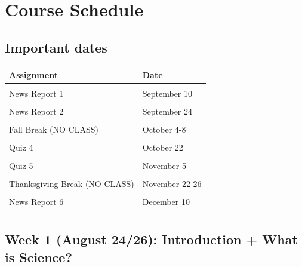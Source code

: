 \documentclass[
  11pt,
]{article}
\begin{document}
\hypertarget{course-schedule}{%
\section{Course Schedule}\label{course-schedule}}

\hypertarget{important-dates}{%
\subsection{Important dates}\label{important-dates}}

\begin{table}[!h]
\centering
\begin{tabular}[t]{ll}
\toprule
Assignment & Date\\
\midrule
\cellcolor{gray!6}{Quiz 1} & \cellcolor{gray!6}{September 3}\\
News Report 1 & September 10\\
\cellcolor{gray!6}{Quiz 2} & \cellcolor{gray!6}{September 17}\\
News Report 2 & September 24\\
\cellcolor{gray!6}{Quiz 3} & \cellcolor{gray!6}{October 1}\\
\addlinespace
Fall Break (NO CLASS) & October 4-8\\
\cellcolor{gray!6}{News Report 3} & \cellcolor{gray!6}{October 15}\\
Quiz 4 & October 22\\
\cellcolor{gray!6}{News Report 4} & \cellcolor{gray!6}{October 29}\\
Quiz 5 & November 5\\
\addlinespace
\cellcolor{gray!6}{News Report 5} & \cellcolor{gray!6}{November 12}\\
Thanksgiving Break (NO CLASS) & November 22-26\\
\cellcolor{gray!6}{Quiz 6} & \cellcolor{gray!6}{December 3}\\
News Report 6 & December 10\\
\cellcolor{gray!6}{Final Exam} & \cellcolor{gray!6}{TBD}\\
\bottomrule
\end{tabular}
\end{table}

\hypertarget{week-1-august-2426-introduction-what-is-science}{%
\subsection{Week 1 (August 24/26): Introduction + What is
Science?}\label{week-1-august-2426-introduction-what-is-science}}
\end{document}
